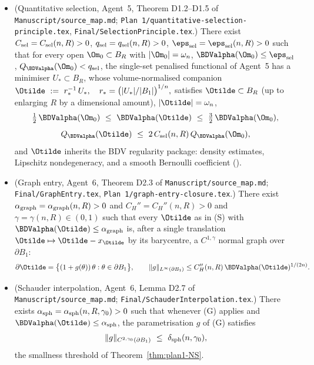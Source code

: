 \begin{itemize}
\item[(S)] (Quantitative selection, Agent~5, Theorem D1.2--D1.5 of
   \texttt{Manuscript/source\_map.md}; \texttt{Plan 1/quantitative-selection-principle.tex},
   \texttt{Final/SelectionPrinciple.tex}.)
   There exist $C_{\rm sel}=C_{\rm sel}(n,R)>0$,
   $q_{\rm sel}=q_{\rm sel}(n,R)>0$, $\eps_{\rm sel}=\eps_{\rm sel}(n,R)>0$
   such that for every open $\Om_{0}\subset B_{R}$ with
   $|\Om_{0}|=\omega_{n}$, $\BDValpha(\Om_{0})\le\eps_{\rm sel}$,
   $Q_{\BDValpha}(\Om_{0})<q_{\rm sel}$, the single-set penalised
   functional of Agent~5 has a minimiser $U_{*}\subset B_{R}$, whose
   volume-normalised companion
   \(
      \Otilde\ :=\ r_{*}^{-1}\,U_{*},
      \quad r_{*}=\bigl(|U_{*}|/|B_{1}|\bigr)^{1/n},
   \)
   satisfies $\Otilde\subset B_{R}$ (up to enlarging $R$ by a dimensional
   amount), $|\Otilde|=\omega_{n}$,
   \begin{equation}\label{eq:plan1-S-alpha}
      \tfrac{1}{2}\,\BDValpha(\Om_{0})\ \le\ \BDValpha(\Otilde)\ \le\
      \tfrac{3}{2}\,\BDValpha(\Om_{0}),
   \end{equation}
   \begin{equation}\label{eq:plan1-S-Q}
      Q_{\BDValpha}(\Otilde)\ \le\ 2\,C_{\rm sel}(n,R)\,
      Q_{\BDValpha}(\Om_{0}),
   \end{equation}
   and $\Otilde$ inherits the BDV regularity package: density estimates,
   Lipschitz nondegeneracy, and a smooth Bernoulli coefficient
   (\cite[Lemmas~4.9, 4.12, 4.16]{BDV}).

\item[(G)] (Graph entry, Agent~6,
   Theorem D2.3 of \texttt{Manuscript/source\_map.md};
   \texttt{Final/GraphEntry.tex}, \texttt{Plan 1/graph-entry-closure.tex}.)
   There exist $\alpha_{\rm graph}=\alpha_{\rm graph}(n,R)>0$ and
   $C_{H}''=C_{H}''(n,R)>0$ and $\gamma=\gamma(n,R)\in(0,1)$ such that
   every $\Otilde$ as in (S) with
   $\BDValpha(\Otilde)\le\alpha_{\rm graph}$ is, after a single
   translation $\Otilde\mapsto\Otilde-x_{\Otilde}$ by its
   barycentre, a $C^{1,\gamma}$ normal graph over $\partial B_{1}$:
   \begin{equation}\label{eq:plan1-G}
      \partial\Otilde=\bigl\{(1+g(\theta))\,\theta:\theta\in\partial B_{1}\bigr\},
      \qquad
      \|g\|_{L^{\infty}(\partial B_{1})}\le C_{H}''(n,R)\,
      \BDValpha(\Otilde)^{1/(2n)}.
   \end{equation}

\item[(I)] (Schauder interpolation, Agent~6,
   Lemma D2.7 of \texttt{Manuscript/source\_map.md};
   \texttt{Final/SchauderInterpolation.tex}.)
   There exists $\alpha_{\rm sph}=\alpha_{\rm sph}(n,R,\gamma_{0})>0$
   such that whenever (G) applies and
   $\BDValpha(\Otilde)\le\alpha_{\rm sph}$, the parametrisation $g$ of
   (G) satisfies
   \begin{equation}\label{eq:plan1-I}
      \|g\|_{C^{2,\gamma_{0}}(\partial B_{1})}\ \le\
      \delta_{\rm sph}(n,\gamma_{0}),
   \end{equation}
   the smallness threshold of Theorem~\ref{thm:plan1-NS}.
\end{itemize}

